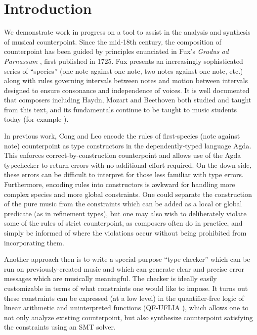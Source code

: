 \documentclass[sigplan,screen]{acmart}
\begin{document}
\section{Introduction}

We demonstrate work in progress on a tool to assist in the analysis and
synthesis of musical counterpoint. Since the mid-18th century, the
composition of counterpoint has been guided by principles enunciated
in Fux's \textit{Gradus ad Parnassum} \citep{Fux1965}, first published
in 1725. Fux presents an increasingly sophisticated series of
``species'' (one note against one note, two notes against one note,
etc.) along with rules governing intervals between notes and motion
between intervals designed to ensure consonance and independence of
voices. It is well documented \citep{Mann1987} that composers
including Haydn, Mozart and Beethoven both studied and taught from
this text, and its fundamentals continue to be taught to music students
today (for example \cite{Kennan1999, Aldwell2018}).

In previous work, Cong and Leo \citep{CongLeo2019} encode the rules of
first-species (note against note) counterpoint as type constructors in
the dependently-typed language Agda. This enforces
correct-by-construction counterpoint and allows use of the Agda
typechecker to return errors with no additional effort required. On
the down side, these errors can be difficult to interpret for those
less familiar with type errors. Furthermore, encoding rules into
constructors is awkward for handling more complex species and more
global constraints. One could separate the construction of the pure
music from the constraints which can be added as a local or global
predicate (as in refinement types), but one may also wish to
deliberately violate some of the rules of strict counterpoint, as
composers often do in practice, and simply be informed of where the
violations occur without being prohibited from incorporating them.

Another approach then is to write a special-purpose ``type checker''
which can be run on previously-created music and which can generate
clear and precise error messages which are musically meaningful. The
checker is ideally easily customizable in terms of what constraints
one would like to impose. It turns out these constraints can be
expressed (at a low level) in the quantifier-free logic of linear
arithmetic and uninterpreted functions (QF-UFLIA \cite{Barrett2010}),
which allows one to not only analyze existing counterpoint, but also
synthesize counterpoint satisfying the constraints using an SMT
solver.
\end{document}
